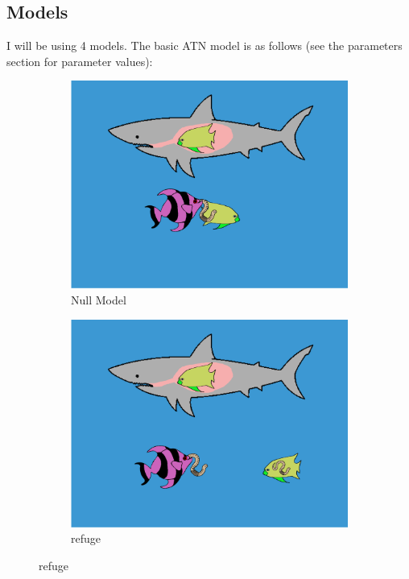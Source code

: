 \documentclass[11pt]{amsart}
\begin{document}
\subsection{Models}
I will be using 4 models.  The basic ATN model is as follows (see the parameters section for parameter values):

\begin{figure}
\begin{subfigure}{.45\textwidth}
\caption{Null Model\label{subfig:modelsA}}
\includegraphics[width=\textwidth]{../figures/Null.png}
\end{subfigure}
\begin{subfigure}{.45\textwidth}
\caption{refuge\label{subfig:modelsb}}
\includegraphics[width=\textwidth]{../figures/Null+Ref.png}
\end{subfigure}


\end{figure}
\end{document}
